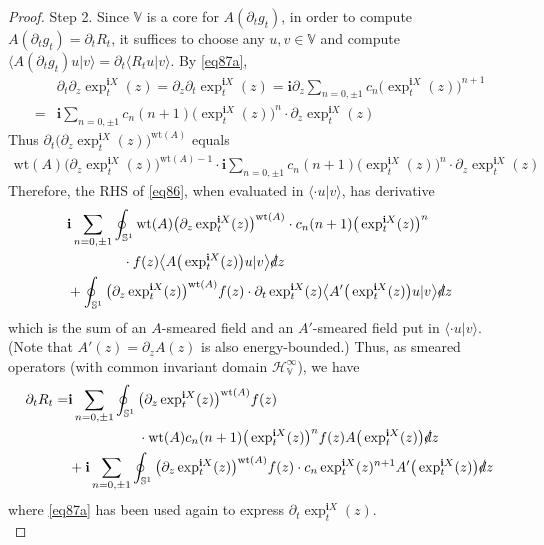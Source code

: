 \documentclass[12pt,b5paper,notitlepage]{article}
\theoremstyle{definition}
\theoremstyle{plain}
\newcommand{\bk}[1]{\langle {#1}\rangle}
\newcommand{\bigbk}[1]{\big\langle {#1}\big\rangle}
\newcommand{\im}{\mathbf{i}}
\newcommand{\Vbb}{\mathbb V}
\newcommand{\wt}{\mathrm{wt}}
\newcommand{\Sbb}{{\mathbb S}}
\newcommand{\HV}{\mathcal H_{\mathbb V}}
\newcommand{\ointn}{\oint\nolimits}
\newcommand{\sd}{\slashed{d}}
\numberwithin{equation}{section}
\begin{document}
\begin{proof}
Step 2. Since $\Vbb$ is a core for $A(\partial_tg_t)$, in order to compute $A(\partial_tg_t)=\partial_tR_t$, it suffices to choose any $u,v\in\Vbb$ and compute $\bk{A(\partial_tg_t)u|v}=\partial_t\bk{R_tu|v}$. By \eqref{eq87a}, 
\begin{align*}
&\partial_t\partial_z\exp^{\im X}_t(z)=\partial_z\partial_t\exp^{\im X}_t(z)=\im\partial_z\sum_{n=0,\pm1} c_n \big(\exp^{\im X}_t(z)\big)^{n+1}\\
=&\im\sum_{n=0,\pm1} c_n (n+1)\big(\exp^{\im X}_t(z)\big)^n\cdot\partial_z\exp^{\im X}_t(z)
\end{align*}
Thus $\partial_t\big(\partial_z\exp^{\im X}_t(z)\big)^{\wt(A)}$ equals
\begin{align*}
\wt(A)\big(\partial_z\exp^{\im X}_t(z)\big)^{\wt(A)-1}\cdot \im\sum_{n=0,\pm1} c_n (n+1)\big(\exp^{\im X}_t(z)\big)^n\cdot\partial_z\exp^{\im X}_t(z)
\end{align*}
Therefore, the RHS of \eqref{eq86}, when evaluated in $\bk{\cdot u|v}$, has derivative
\begin{align*}
&\im \sum_{n=0,\pm1}\ointn_{\Sbb^1}\wt(A)\big(\partial_z\exp^{\im X}_t(z)\big)^{\wt(A)}\cdot c_n (n+1)\big(\exp^{\im X}_t(z)\big)^n\\
&\qquad\qquad\cdot f(z)\bigbk{A\big(\exp^{\im X}_t(z)\big)u|v}\sd z\\
&+\ointn_{\Sbb^1} \big(\partial_z\exp^{\im X}_t(z)\big)^{\wt(A)}f(z)\cdot \partial_t\exp^{\im X}_t(z) \bigbk{A'\big(\exp^{\im X}_t(z)\big)u|v}\sd z
\end{align*}
which is the sum of an $A$-smeared field and an $A'$-smeared field put in $\bk{\cdot u|v}$. (Note that $A'(z)=\partial_zA(z)$ is also energy-bounded.) Thus, as smeared operators (with common invariant domain $\HV^\infty$), we have
\begin{align*}
\partial_tR_t=&\im \sum_{n=0,\pm1}\ointn_{\Sbb^1}\big(\partial_z\exp^{\im X}_t(z)\big)^{\wt(A)}f(z)\\
&\qquad\qquad\quad \cdot\wt(A) c_n (n+1)\big(\exp^{\im X}_t(z)\big)^n f(z)A\big(\exp^{\im X}_t(z)\big)\sd z\\
&+\im \sum_{n=0,\pm1}\ointn_{\Sbb^1} \big(\partial_z\exp^{\im X}_t(z)\big)^{\wt(A)}f(z)\cdot c_n \exp^{\im X}_t(z)^{n+1} A'\big(\exp^{\im X}_t(z)\big)\sd z
\end{align*} 
where \eqref{eq87a} has been used again to express $\partial_t\exp_t^{\im X}(z)$.\\[-1ex]


\end{proof}
\end{document}
